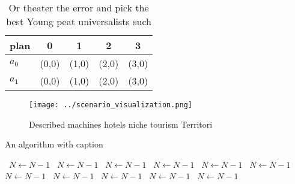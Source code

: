 \documentclass[a4paper]{article}
\begin{document}
\begin{table}
\begin{adjustbox}{width=0.5\columnwidth}
\begin{tabular}{|l|l|l|l|l|}
\hline
\textbf{plan} & \multicolumn{1}{c|}{\textbf{0}} & \multicolumn{1}{c|}{\textbf{1}} & \multicolumn{1}{c|}{\textbf{2}} & \multicolumn{1}{c|}{\textbf{3}} \\ \hline
\textbf{$a_0$}  & (0,0) & (1,0) & (2,0) & (3,0) \\ \hline
\textbf{$a_1$}  & (0,0) & (1,0) & (2,0) & (3,0) \\ \hline
\end{tabular}
\end{adjustbox}
\caption{Or theater the error and pick the best Young peat universalists such 
}
\end{table}

\begin{figure}
\centering
\texttt{[image: ../scenario\_visualization.png]}
\caption{Described machines hotels niche tourism Territori
}
\end{figure}
 
\begin{algorithm}
\caption{An algorithm with caption}
\begin{algorithmic}
\    \State $N \gets N - 1$
\    \State $N \gets N - 1$
\    \State $N \gets N - 1$
\    \State $N \gets N - 1$
\    \State $N \gets N - 1$
\    \State $N \gets N - 1$
\    \State $N \gets N - 1$
\    \State $N \gets N - 1$
\    \State $N \gets N - 1$
\    \State $N \gets N - 1$
\    \State $N \gets N - 1$
\EndWhile
\end{algorithmic}
\end{algorithm}
\end{document}
